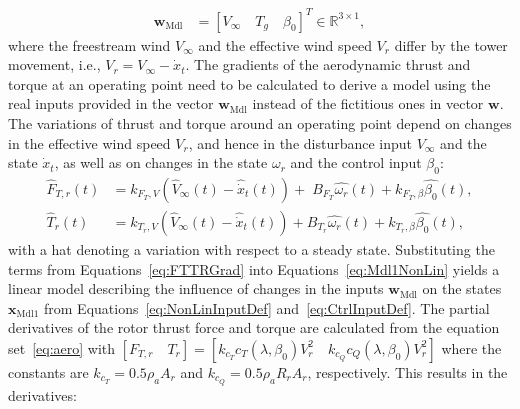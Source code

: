 \begin{align} \label{eq:CtrlInputDef}
    \bm{w}_{\text{Mdl}} &= [ V_{\infty} \quad T_{g} \quad \beta_{0}]^T \in \mathbb{R}^{3 \times 1},
\end{align}
where the freestream wind $V_{\infty}$ and the effective wind speed $V_r$ differ by the tower movement, i.e., $V_r = V_{\infty} - \dot{x}_t$.
The gradients of the aerodynamic thrust and torque at an operating point need to be calculated to derive a model using the real inputs provided in the vector $\bm{w}_{\text{Mdl}}$ instead of the fictitious ones in vector $\bm{w}$. The variations of thrust and torque around an operating point depend on changes in the effective wind speed $V_r$, and hence in the disturbance input $V_{\infty}$ and the state $\dot{x}_t$, as well as on changes in the state $\omega_r$ and the control input $\beta_{0}$:
\begin{equation} \label{eq:FTTRGrad}
    \begin{split}
        \hat{F}_{T,r}(t) &= k_{F_T,V} \left( \hat{V}_{\infty}(t) - \hat{\dot{x}}_{t}(t)\right) + \; B_{F_T} \hat{\omega_r}(t) +  k_{F_T,\beta} \hat{\beta_0}(t), \\
        \hat{T}_r(t) &= k_{T_r,V} \left( \hat{V}_{\infty}(t) - \hat{\dot{x}}_{t}(t)\right) + B_{T_r} \hat{\omega_r}(t) + k_{T_r,\beta} \hat{\beta_0}(t),
    \end{split}
\end{equation} \enlargethispage{\baselineskip}
with a hat denoting a variation with respect to a steady state. Substituting the terms from Equations~\eqref{eq:FTTRGrad} into Equations~\eqref{eq:Mdl1NonLin} yields a linear model describing the influence of changes in the inputs $\bm{w}_{\text{Mdl}}$ on the states $\bm{x}_{\text{Mdl1}}$ from Equations~\eqref{eq:NonLinInputDef} and~\eqref{eq:CtrlInputDef}. The partial derivatives of the rotor thrust force and torque are calculated from the equation set~\eqref{eq:aero} with $[F_{T,r} \quad T_r] = [k_{c_T} c_T(\lambda,\beta_0) V_r^2 \quad k_{c_Q}  c_Q(\lambda,\beta_0) V_r^2]$ where the constants are $k_{c_T} = 0.5 \rho_a A_r$ and $k_{c_Q} = 0.5 \rho_a R_r A_r$, respectively. This results in the derivatives: 
